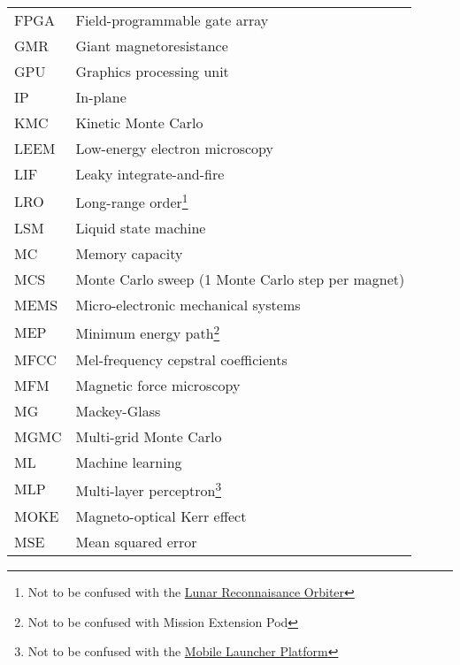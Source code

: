 {\begin{longtable}[l]{ll}
        FPGA  & Field-programmable gate array               \\
        GMR   & Giant magnetoresistance                     \\
        GPU   & Graphics processing unit                    \\
        IP    & In-plane                                    \\
        KMC   & Kinetic Monte Carlo                         \\
        LEEM  & Low-energy electron microscopy              \\
        LIF   & Leaky integrate-and-fire                    \\
        LRO   & Long-range order\footnote{Not to be confused with the \href{https://en.wikipedia.org/wiki/Lunar_Reconnaissance_Orbiter}{Lunar Reconnaisance Orbiter}} \\
        LSM   & Liquid state machine                        \\
        MC    & Memory capacity                             \\ %
        MCS   & Monte Carlo sweep (1 Monte Carlo step per magnet) \\
        MEMS  & Micro-electronic mechanical systems         \\
        MEP   & Minimum energy path\footnote{Not to be confused with Mission Extension Pod} \\
        MFCC  & Mel-frequency cepstral coefficients         \\
        MFM   & Magnetic force microscopy                   \\
        MG    & Mackey-Glass                                \\
        MGMC  & Multi-grid Monte Carlo                      \\
        ML    & Machine learning                            \\
        MLP   & Multi-layer perceptron\footnote{Not to be confused with the \href{https://en.wikipedia.org/wiki/Mobile_launcher_platform}{Mobile Launcher Platform}} \\ %
        MOKE  & Magneto-optical Kerr effect                 \\
        MSE   & Mean squared error                          \\

\end{longtable}}
